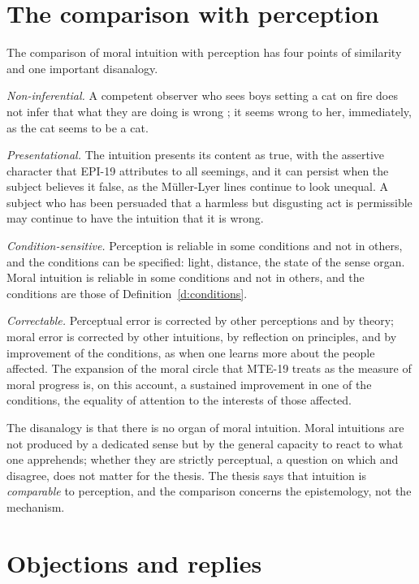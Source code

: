 \documentclass{situationist-preprint}
\begin{document}
\section{The comparison with perception}

The comparison of moral intuition with perception has four points of similarity and one important disanalogy.

\emph{Non-inferential.} A competent observer who sees boys setting a cat on fire does not infer that what they are doing is wrong \citep{Harman1977}; it seems wrong to her, immediately, as the cat seems to be a cat.

\emph{Presentational.} The intuition presents its content as true, with the assertive character that EPI-19 attributes to all seemings, and it can persist when the subject believes it false, as the Müller-Lyer lines continue to look unequal. A subject who has been persuaded that a harmless but disgusting act is permissible may continue to have the intuition that it is wrong.

\emph{Condition-sensitive.} Perception is reliable in some conditions and not in others, and the conditions can be specified: light, distance, the state of the sense organ. Moral intuition is reliable in some conditions and not in others, and the conditions are those of Definition~\ref{d:conditions}.

\emph{Correctable.} Perceptual error is corrected by other perceptions and by theory; moral error is corrected by other intuitions, by reflection on principles, and by improvement of the conditions, as when one learns more about the people affected. The expansion of the moral circle that MTE-19 treats as the measure of moral progress is, on this account, a sustained improvement in one of the conditions, the equality of attention to the interests of those affected.

The disanalogy is that there is no organ of moral intuition. Moral intuitions are not produced by a dedicated sense but by the general capacity to react to what one apprehends; whether they are strictly perceptual, a question on which \citet{McGrath2004} and \citet{Vayrynen2018} disagree, does not matter for the thesis. The thesis says that intuition is \emph{comparable} to perception, and the comparison concerns the epistemology, not the mechanism.

\section{Objections and replies}
\end{document}
